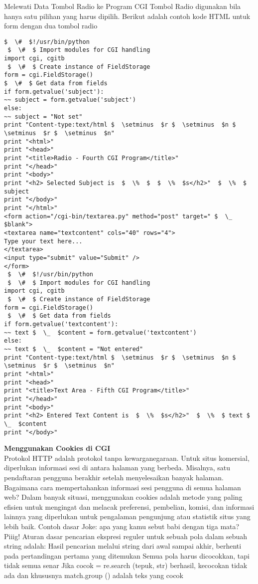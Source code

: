 \begin{enumerate}
\begin{enumerate}
Melewati Data Tombol Radio ke Program CGI
Tombol Radio digunakan bila hanya satu pilihan yang harus dipilih.
Berikut adalah contoh kode HTML untuk form dengan dua tombol radio
\begin{verbatim}
$  \#  $!/usr/bin/python
 $  \#  $ Import modules for CGI handling
import cgi, cgitb
 $  \#  $ Create instance of FieldStorage
form = cgi.FieldStorage()
$  \#  $ Get data from fields
if form.getvalue('subject'):
~~ subject = form.getvalue('subject')
else:
~~ subject = "Not set"
print "Content-type:text/html $  \setminus  $r $  \setminus  $n $  \setminus  $r $  \setminus  $n"
print "<html>"
print "<head>"
print "<title>Radio - Fourth CGI Program</title>"
print "</head>"
print "<body>"
print "<h2> Selected Subject is  $  \%  $  $  \%  $s</h2>"  $  \%  $ subject
print "</body>"
print "</html>"
<form action="/cgi-bin/textarea.py" method="post" target=" $  \_  $blank">
<textarea name="textcontent" cols="40" rows="4">
Type your text here...
</textarea>
<input type="submit" value="Submit" />
</form>
 $  \#  $!/usr/bin/python
 $  \#  $ Import modules for CGI handling
import cgi, cgitb
 $  \#  $ Create instance of FieldStorage
form = cgi.FieldStorage()
 $  \#  $ Get data from fields
if form.getvalue('textcontent'):
~~ text $  \_  $content = form.getvalue('textcontent')
else:
~~ text $  \_  $content = "Not entered"
print "Content-type:text/html $  \setminus  $r $  \setminus  $n $  \setminus  $r $  \setminus  $n"
print "<html>"
print "<head>"
print "<title>Text Area - Fifth CGI Program</title>"
print "</head>"
print "<body>"
print "<h2> Entered Text Content is  $  \%  $s</h2>"  $  \%  $ text $  \_  $content
print "</body>"
\end{verbatim}
{\fontsize{14pt}{14pt}\selectfont \textbf{Menggunakan Cookies di CGI} \\}
Protokol HTTP adalah protokol tanpa kewarganegaraan. Untuk situs komersial, diperlukan informasi sesi di antara halaman yang berbeda. Misalnya, satu pendaftaran pengguna berakhir setelah menyelesaikan banyak halaman. Bagaimana cara mempertahankan informasi sesi pengguna di semua halaman web? Dalam banyak situasi, menggunakan cookies adalah metode yang paling efisien untuk mengingat dan melacak preferensi, pembelian, komisi, dan informasi lainnya yang diperlukan untuk pengalaman pengunjung atau statistik situs yang lebih baik.
Contoh dasar
Joke: apa yang kamu sebut babi dengan tiga mata? Piiig!
Aturan dasar pencarian ekspresi reguler untuk sebuah pola dalam sebuah string adalah:
Hasil pencarian melalui string dari awal sampai akhir, berhenti pada pertandingan pertama yang ditemukan  Semua pola harus dicocokkan, tapi tidak semua senar Jika cocok = re.search (tepuk, str) berhasil, kecocokan tidak ada dan khususnya match.group () adalah teks yang cocok

\end{enumerate}
\end{enumerate}

